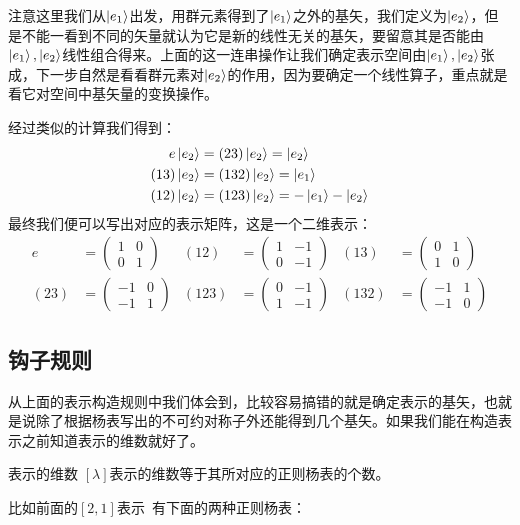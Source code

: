 注意这里我们从$\ket{e_1}$出发，用群元素得到了$\ket{e_1}$之外的基矢，我们定义为$\ket{e_2}$，但是不能一看到不同的矢量就认为它是新的线性无关的基矢，要留意其是否能由$\ket{e_1},\ket{e_2}$线性组合得来。上面的这一连串操作让我们确定表示空间由$\ket{e_1},\ket{e_2}$张成，下一步自然是看看群元素对$\ket{e_2}$的作用，因为要确定一个线性算子，重点就是看它对空间中基矢量的变换操作。

经过类似的计算我们得到：
\begin{equation}
	\begin{aligned}
		e\ket{e_2}&=(23)\ket{e_2}=\ket{e_2}\\
		(13)\ket{e_2}&=(132)\ket{e_2}=\ket{e_1}\\
		(12)\ket{e_2}&=(123)\ket{e_2}=-\ket{e_1}-\ket{e_2}
	\end{aligned}
\end{equation}
最终我们便可以写出对应的表示矩阵，这是一个二维表示：
\begin{equation}
	\begin{aligned}
		e& = \begin{pmatrix}
			1&0 \\
			0&1
		\end{pmatrix}&(12)&=\begin{pmatrix}
			1&-1 \\
			0&-1
		\end{pmatrix}&(13)&=\begin{pmatrix}
			0&1 \\
			1&0
		\end{pmatrix}\\
		(23)&=\begin{pmatrix}
			-1&0 \\
			-1&1
		\end{pmatrix}&(123)&=\begin{pmatrix}
			0&-1 \\
			1&-1
		\end{pmatrix}&(132)&=\begin{pmatrix}
			-1&1 \\
			-1&0
		\end{pmatrix}
	\end{aligned}
\end{equation}
\subsection{钩子规则}
从上面的表示构造规则中我们体会到，比较容易搞错的就是确定表示的基矢，也就是说除了根据杨表写出的不可约对称子外还能得到几个基矢。如果我们能在构造表示之前知道表示的维数就好了。
\begin{theorem}{表示的维数}
	$[\lambda]$表示的维数等于其所对应的正则杨表的个数。
\end{theorem}
比如前面的$[2,1]$表示{\ }有下面的两种正则杨表：

